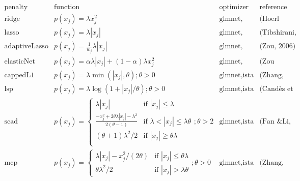 \documentclass[preview]{standalone}
\begin{document}
$$
\begin{array}{l|llll}
	\text{penalty} & \text{function} & \text{optimizer} & \text{reference}\\
	\hline
	\text{ridge} & p( x_j) = \lambda x_j^2 & \text{glmnet, ista} & \text{(Hoerl \& Kennard, 1970)}\\
	\text{lasso} & p( x_j) = \lambda| x_j| & \text{glmnet, ista} & \text{(Tibshirani, 1996)}\\
	\text{adaptiveLasso} & p( x_j) = \frac{1}{w_j}\lambda| x_j| & \text{glmnet, ista} & \text{(Zou, 2006)}\\
	\text{elasticNet} & p( x_j) = \alpha\lambda| x_j| + (1-\alpha)\lambda x_j^2 & \text{glmnet, ista} & \text{(Zou \& Hastie, 2005)}\\
	\text{cappedL1} & p( x_j) = \lambda \min(| x_j|, \theta); \theta > 0 &\text{glmnet,ista}& \text{(Zhang, 2010)}\\
	\text{lsp} & p( x_j) = \lambda \log(1 + |x_j|/\theta); \theta > 0 &\text{glmnet,ista}& \text{(Candès et al., 2008)} \\
	\text{scad} & p( x_j) = \begin{cases}
		\lambda |x_j| & \text{if } |x_j| \leq \lambda\\
		\frac{-x_j^2 + 2\theta\lambda |x_j| - \lambda^2}{2(\theta -1)} & \text{if } \lambda < |x_j| \leq \lambda\theta \\
		(\theta + 1) \lambda^2/2 & \text{if } |x_j| \geq \theta\lambda\\
	\end{cases}; \theta > 2 &\text{glmnet,ista}& \text{(Fan \& Li, 2001)} \\
	\text{mcp} & p( x_j) = 
	\begin{cases}
		\lambda |x_j| - x_j^2/(2\theta) & \text{if } |x_j| \leq \theta\lambda\\
		\theta\lambda^2/2 & \text{if } |x_j| > \lambda\theta
	\end{cases}; \theta > 0 &\text{glmnet,ista}& \text{(Zhang, 2010)}
\end{array}
$$
\end{document}
